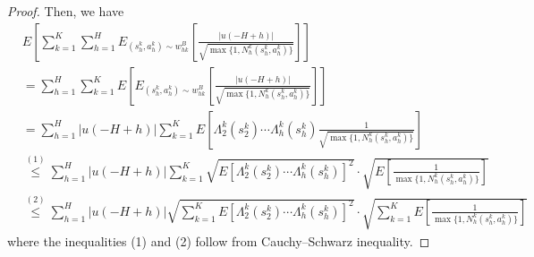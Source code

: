 \documentclass[11pt]{article}
\newcommand{\1}{\mathbbm{1}}
\begin{document}
\begin{proof}


Then, we have
\begin{align*}
&E\left [\sum_{k=1}^K\sum_{h=1}^H E_{(s_h^k,a_h^k)\sim w_{hk}^{B}}\left [\frac{\vert u(-H+h)\vert}{\sqrt{\max\{1,N_h^k(s_h^k,a_h^k)\}}}\right ]\right ]\\
&=\sum_{h=1}^H\sum_{k=1}^K E\left [ E_{(s_h^k,a_h^k)\sim w_{hk}^{B}}\left [\frac{\vert u(-H+h)\vert}{\sqrt{\max\{1,N_h^k(s_h^k,a_h^k)\}}}\right ]\right ]\\
&=\sum_{h=1}^H\vert u(-H+h)\vert\sum_{k=1}^K E\left [\Lambda_2^k(s_2^k)\cdots\Lambda_h^k(s_h^k)\frac{1}{\sqrt{\max\{1,N_h^k(s_h^k,a_h^k)\}}}\right ]\\
&\overset{(1)}{\leq} \sum_{h=1}^H\vert u(-H+h)\vert\sum_{k=1}^K \sqrt{E\left [\Lambda_2^k(s_2^k)\cdots\Lambda_h^k(s_h^k)\right ]^2}\cdot \sqrt{E\left[\frac{1}{\max\{1,N_h^k(s_h^k,a_h^k)\}}\right]} \\
&\overset{(2)}{\leq} \sum_{h=1}^H\vert u(-H+h)\vert\sqrt{\sum_{k=1}^K E\left [\Lambda_2^k(s_2^k)\cdots\Lambda_h^k(s_h^k)\right ]^2}\cdot \sqrt{\sum_{k=1}^K E\left[\frac{1}{\max\{1,N_h^k(s_h^k,a_h^k)\}}\right]}
\end{align*}
where the inequalities (1) and (2) follow from Cauchy–Schwarz inequality.


\end{proof}
\end{document}
